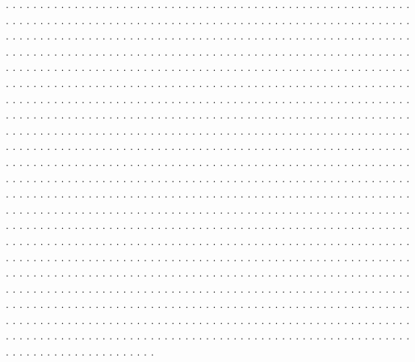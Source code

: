 \documentclass[twocolumn]{revtex4}
\begin{document}
. . . . . . . . . . . . . . . . . . . . . . . . . . . . . . . . . . . . . . . .
. . . . . . . . . . . . . . . . . . . . . . . . . . . . . . . . . . . . . . . .
. . . . . . . . . . . . . . . . . . . . . . . . . . . . . . . . . . . . . . . .
. . . . . . . . . . . . . . . . . . . . . . . . . . . . . . . . . . . . . . . .
. . . . . . . . . . . . . . . . . . . . . . . . . . . . . . . . . . . . . . . .
. . . . . . . . . . . . . . . . . . . . . . . . . . . . . . . . . . . . . . . .
. . . . . . . . . . . . . . . . . . . . . . . . . . . . . . . . . . . . . . . .
. . . . . . . . . . . . . . . . . . . . . . . . . . . . . . . . . . . . . . . .
. . . . . . . . . . . . . . . . . . . . . . . . . . . . . . . . . . . . . . . .
. . . . . . . . . . . . . . . . . . . . . . . . . . . . . . . . . . . . . . . .
. . . . . . . . . . . . . . . . . . . . . . . . . . . . . . . . . . . . . . . .
. . . . . . . . . . . . . . . . . . . . . . . . . . . . . . . . . . . . . . . .
. . . . . . . . . . . . . . . . . . . . . . . . . . . . . . . . . . . . . . . .
. . . . . . . . . . . . . . . . . . . . . . . . . . . . . . . . . . . . . . . .
. . . . . . . . . . . . . . . . . . . . . . . . . . . . . . . . . . . . . . . .
. . . . . . . . . . . . . . . . . . . . . . . . . . . . . . . . . . . . . . . .
. . . . . . . . . . . . . . . . . . . . . . . . . . . . . . . . . . . . . . . .
. . . . . . . . . . . . . . . . . . . . . . . . . . . . . . . . . . . . . . . .
. . . . . . . . . . . . . . . . . . . . . . . . . . . . . . . . . . . . . . . .
. . . . . . . . . . . . . . . . . . . . . . . . . . . . . . . . . . . . . . . .
. . . . . . . . . . . . . . . . . . . . . . . . . . . . . . . . . . . . . . . .
. . . . . . . . . . . . . . . . . . . . . . . . . . . . . . . . . . . . . . . .
. . . . . . . . . . . . . . . . . . . . . . . . . . . . . . . . . . . . . . . .
. . . . . . . . . . . . . . . . . . . . . . . . . . . . . . . . . . . . . . . .
. . . . . . . . . . . . . . . . . . . . . . . . . . . . . . . . . . . . . . . .
. . . . . . . . . . . . . . . . . . . . . . . . . . . . . . . . . . . . . . . .
. . . . . . . . . . . . . . . . . . . . . . . . . . . . . . . . . . . . . . . .
. . . . . . . . . . . . . . . . . . . . . . . . . . . . . . . . . . . . . . . .
. . . . . . . . . . . . . . . . . . . . . . . . . . . . . . . . . . . . . . . .
. . . . . . . . . . . . . . . . . . . . . . . . . . . . . . . . . . . . . . . .
. . . . . . . . . . . . . . . . . . . . . . . . . . . . . . . . . . . . . . . .
. . . . . . . . . . . . . . . . . . . . . . . . . . . . . . . . . . . . . . . .
. . . . . . . . . . . . . . . . . . . . . . . . . . . . . . . . . . . . . . . .
\end{document}
